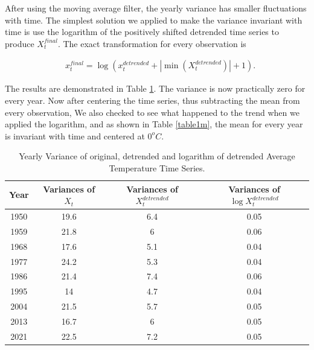 \documentclass[conference]{IEEEtran}
\begin{document}
After using the moving average filter, the yearly variance has smaller fluctuations with time. The simplest solution we applied to make the variance invariant with time is use the logarithm of the positively shifted detrended time series to produce $X_t^{final}$. The exact transformation for every observation is

\begin{equation}\label{logmas}
    \begin{split}
        & x_t^{final} = \log\left(x_t^{detrended}+\left|\min(X_t^{detrended})\right|+1\right).
    \end{split}
\end{equation}
\vspace{8mm}

The results are demonstrated in Table \ref{tablev}. The variance is now practically zero for every year. Now after centering the time series, thus subtracting the mean from every observation, We also checked to see what happened to the trend when we applied the logarithm, and as shown in Table \ref{table1m}, the mean for every year is invariant with time and centered at $0 ^o C$.

\begin{table}
\begin{center}
\begin{tabular}{||c||c||c||c||} 
 \hline 
 Year & Variances of $X_t$ & \makecell{Variances of\\$X_t^{detrended}$} & \makecell{Variances of\\$\log X_t^{detrended}$} \\ [0.5ex] 
 \hline\hline
 1950 & 19.6 & 6.4 & 0.05 \\ 
 \hline
 1959 & 21.8 & 6 & 0.06\\
 \hline
 1968 & 17.6 & 5.1 & 0.04\\
 \hline
 1977 & 24.2 & 5.3 & 0.04\\
 \hline
 1986 & 21.4 & 7.4 & 0.06\\
 \hline
 1995 & 14 & 4.7 & 0.04\\
 \hline
 2004 & 21.5 & 5.7 & 0.05\\
 \hline
 2013 & 16.7 & 6 & 0.05\\
 \hline
 2021 & 22.5 & 7.2 & 0.05\\
 \hline
\end{tabular}
\end{center}
\caption{Yearly Variance of original, detrended and logarithm \break of detrended Average Temperature Time Series.}
\label{tablev}
\end{table}
\end{document}
